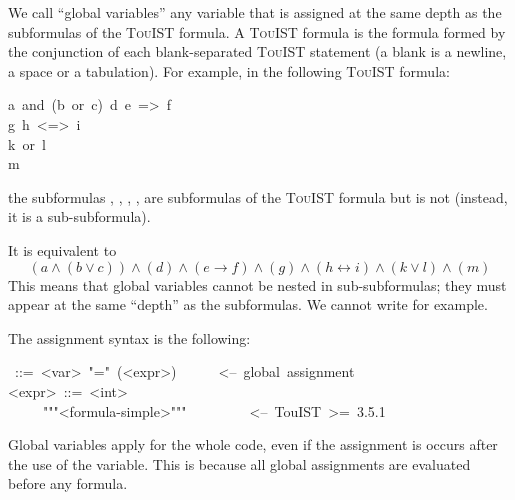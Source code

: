 {\noindent We call \textquotedblleft{}global variables\textquotedblright{} any variable that is assigned at the same
depth as the subformulas of the {\scshape TouIST} formula. A {\scshape TouIST} formula is
the formula formed by the conjunction of each blank-separated {\scshape TouIST}
statement (a blank is a newline, a space or a tabulation). For example,
in the following {\scshape TouIST} formula:%
\begin{mdpre}%
\noindent a~and~(b~or~c)~d~e~=\textgreater{}~f~~~~\\
g~h~\textless{}=\textgreater{}~i\\
k~or~l\\
m%
\end{mdpre}\noindent the subformulas , , , ,
 are subformulas of the {\scshape TouIST} formula but  is not
(instead, it is a sub-subformula).

It is equivalent to%
\noindent\noindent\[  (a \wedge (b \vee c)) \wedge (d) \wedge (e \rightarrow f) \wedge (g)
    \wedge (h \leftrightarrow i) \wedge (k \vee l) \wedge (m)
\]%
\noindent This means that global variables cannot be nested in sub-subformulas;
they must appear at the same \textquotedblleft{}depth\textquotedblright{} as the subformulas. We cannot write
 for example.

The assignment syntax is the following:%
\begin{mdpre}%
~::=~{\textless{}var\textgreater{}}~"="~({\textless{}expr\textgreater{}})~~~~~~{\textless{}--~global~assignment}\\
{\textless{}expr\textgreater{}}~::=~{\textless{}int\textgreater{}}\\
~~~~\textbar{}~"""{\textless{}formula-simple\textgreater{}}"""~~~~~~~~~{\textless{}--~TouIST~\textgreater{}=~3.5.1}%
\end{mdpre}\noindent Global variables apply for the whole code, even if the assignment is
occurs after the use of the variable. This is because all global
assignments are evaluated before any formula.

}
